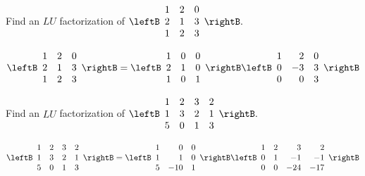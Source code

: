 \begin{enumialphparenastyle}

\label{LU}

\begin{ex} \label{p7.1}Find an $LU$ factorization of $\leftB 
\begin{array}{rrr}
1 & 2 & 0 \\ 
2 & 1 & 3 \\ 
1 & 2 & 3
\end{array}
\rightB .$
\begin{sol}
\[
\leftB
\begin{array}{ccc}
1 & 2 & 0 \\
2 & 1 & 3 \\
1 & 2 & 3
\end{array}
\rightB = \leftB
\begin{array}{ccc}
1 & 0 & 0 \\
2 & 1 & 0 \\
1 & 0 & 1
\end{array}
\rightB \leftB
\begin{array}{rrr}
1 & 2 & 0 \\
0 & -3 & 3 \\
0 & 0 & 3
\end{array}
\rightB
\]

\end{sol}
\end{ex} 

\begin{ex} Find an $LU$ factorization of $\leftB 
\begin{array}{rrrr}
1 & 2 & 3 & 2 \\ 
1 & 3 & 2 & 1 \\ 
5 & 0 & 1 & 3
\end{array}
\rightB .$
\begin{sol}
\[
\leftB
\begin{array}{cccc}
1 & 2 & 3 & 2 \\
1 & 3 & 2 & 1 \\
5 & 0 & 1 & 3
\end{array}
\rightB = \leftB
\begin{array}{rrr}
1 & 0 & 0 \\
1 & 1 & 0 \\
5 & -10 & 1
\end{array}
\rightB \leftB
\begin{array}{rrrr}
1 & 2 & 3 & 2 \\
0 & 1 & -1 & -1 \\
0 & 0 & -24 & -17
\end{array}
\rightB
\]
\end{sol}
\end{ex}



\end{enumialphparenastyle}
